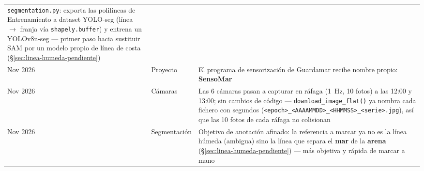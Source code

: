 \begin{longtable}{C{2.5cm} L{4cm} L{7cm}}
  \texttt{segmentation.py}: exporta las polilíneas de Entrenamiento a dataset YOLO-seg
  (línea $\to$ franja vía \texttt{shapely.buffer}) y entrena un YOLOv8n-seg — primer paso
  hacia sustituir SAM por un modelo propio de línea de costa (\S\ref{sec:linea-humeda-pendiente}) \\
Nov 2026 & Proyecto & El programa de sensorización de Guardamar recibe nombre propio:
  \textbf{SensoMar} \\
Nov 2026 & Cámaras & Las 6 cámaras pasan a capturar en ráfaga (1~Hz, 10 fotos) a las 12:00 y
  13:00; sin cambios de código --- \texttt{download\_image\_flat()} ya nombra cada fichero con
  segundos (\texttt{<epoch>\_<AAAAMMDD>\_<HHMMSS>\_<serie>.jpg}), así que las 10 fotos de cada
  ráfaga no colisionan \\
Nov 2026 & Segmentación & Objetivo de anotación afinado: la referencia a marcar ya no es la
  línea húmeda (ambigua) sino la línea que separa el \textbf{mar} de la \textbf{arena}
  (\S\ref{sec:linea-humeda-pendiente}) --- más objetiva y rápida de marcar a mano \\
\end{longtable}


